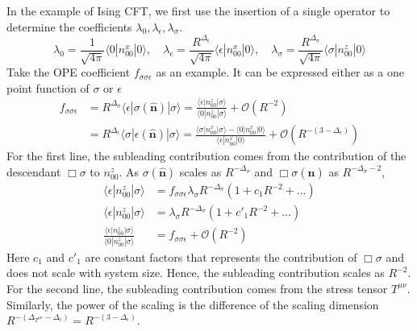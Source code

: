 \documentclass{timesjhep}
\begin{document}
In the example of Ising CFT, we first use the insertion of a single operator to determine the coefficients $\lambda_0,\lambda_\epsilon,\lambda_\sigma$. 
\begin{equation}
    \lambda_0=\frac{1}{\sqrt{4\pi}}\langle 0|n^x_{00}|0\rangle,\quad\lambda_\epsilon=\frac{R^{\Delta_\epsilon}}{\sqrt{4\pi}}\langle \epsilon|n^x_{00}|0\rangle,\quad\lambda_\sigma=\frac{R^{\Delta_\sigma}}{\sqrt{4\pi}}\langle \sigma|n^z_{00}|0\rangle
\end{equation} 
Take the OPE coefficient $f_{\sigma\sigma\epsilon}$ as an example. It can be expressed either as a one point function of $\sigma$ or $\epsilon$
\begin{align}
    f_{\sigma\sigma\epsilon}&=R^{\Delta_\sigma}\langle\epsilon|\sigma(\hat{\mathbf{n}})|\sigma\rangle=\frac{\langle\epsilon|n_{00}^z|\sigma\rangle}{\langle 0|n_{00}^z|\sigma\rangle}+\mathcal{O}(R^{-2})\nonumber\\     &=R^{\Delta_\epsilon}\langle\sigma|\epsilon(\hat{\mathbf{n}})|\sigma\rangle=\frac{\langle\sigma|n^x_{00}|\sigma\rangle-\langle0|n^x_{00}|0\rangle}{\langle\epsilon|n^x_{00}|0\rangle}+\mathcal{O}(R^{-(3-\Delta_\epsilon)}) 
\end{align} 
For the first line, the subleading contribution comes from the contribution of the descendant $\Box\sigma$ to $n_{00}^z$. As $\sigma(\hat{\mathbf{n}})$ scales as $R^{-\Delta_\sigma}$ and $\Box\sigma(\hat{\mathbf{n}})$ as $R^{-\Delta_\sigma-2}$, 
\begin{align}
    \langle\epsilon|n_{00}^z|\sigma\rangle&=f_{\sigma\sigma\epsilon}\lambda_\sigma R^{-\Delta_\sigma}(1+c_1R^{-2}+\dots)\nonumber\\
    \langle\epsilon|n_{00}^z|\sigma\rangle&=\lambda_\sigma R^{-\Delta_\sigma}(1+c'_1R^{-2}+\dots)\nonumber\\
    \frac{\langle\epsilon|n_{00}^z|\sigma\rangle}{\langle 0|n_{00}^z|\sigma\rangle}&=f_{\sigma\sigma\epsilon}+\mathcal{O}(R^{-2}) 
\end{align} 
Here $c_1$ and $c'_1$ are constant factors that represents the contribution of $\Box\sigma$ and does not scale with system size. Hence, the subleading contribution scales as $R^{-2}$. For the second line, the subleading contribution comes from the stress tensor $T^{\mu\nu}$. Similarly, the power of the scaling is the difference of the scaling dimension $R^{-(\Delta_{T^{\mu\nu}}-\Delta_\epsilon)}=R^{-(3-\Delta_\epsilon)}$. 
\end{document}
